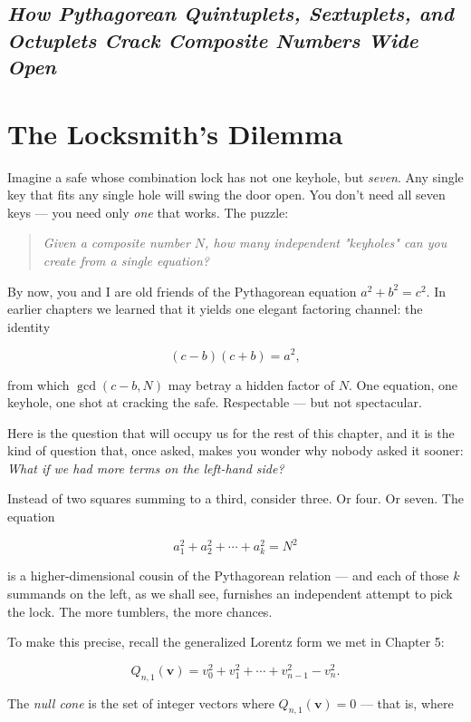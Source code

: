 \documentclass[11pt,twoside,openright]{book}
\theoremstyle{definition}
\theoremstyle{remark}
\begin{document}
\subsection{\textit{How Pythagorean Quintuplets, Sextuplets, and Octuplets Crack Composite Numbers Wide Open}}


\section{The Locksmith's Dilemma}

Imagine a safe whose combination lock has not one keyhole, but \textit{seven}. Any single key that fits any single hole will swing the door open. You don't need all seven keys --- you need only \textit{one} that works. The puzzle:

\begin{quote}
\textit{Given a composite number $N$, how many independent "keyholes" can you create from a single equation?}
\end{quote}
By now, you and I are old friends of the Pythagorean equation $a^2 + b^2 = c^2$. In earlier chapters we learned that it yields one elegant factoring channel: the identity

\[(c - b)(c + b) = a^2,\]

from which $\gcd(c - b, N)$ may betray a hidden factor of $N$. One equation, one keyhole, one shot at cracking the safe. Respectable --- but not spectacular.

Here is the question that will occupy us for the rest of this chapter, and it is the kind of question that, once asked, makes you wonder why nobody asked it sooner: \textit{What if we had more terms on the left-hand side?}

Instead of two squares summing to a third, consider three. Or four. Or seven. The equation

\[a_1^2 + a_2^2 + \cdots + a_k^2 = N^2\]

is a higher-dimensional cousin of the Pythagorean relation --- and each of those $k$ summands on the left, as we shall see, furnishes an independent attempt to pick the lock. The more tumblers, the more chances.

To make this precise, recall the generalized Lorentz form we met in Chapter 5:

\[Q_{n,1}(\mathbf{v}) = v_0^2 + v_1^2 + \cdots + v_{n-1}^2 - v_n^2.\]

The \textit{null cone} is the set of integer vectors where $Q_{n,1}(\mathbf{v}) = 0$ --- that is, where
\end{document}
